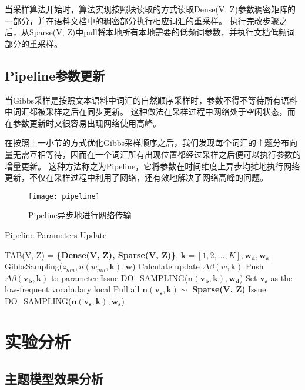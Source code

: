 当采样算法开始时，算法实现按照块读取的方式读取Dense(V, Z)参数稠密矩阵的一部分，并在语料文档中的稠密部分执行相应词汇的重采样。
执行完改步骤之后，从Sparse(V, Z)中pull将本地所有本地需要的低频词参数，并执行文档低频词部分的重采样。

\subsection{Pipeline参数更新}
当Gibbs采样是按照文本语料中词汇的自然顺序采样时，参数不得不等待所有语料中词汇都被采样之后在同步更新。
这种做法在采样过程中网络处于空闲状态，而在参数更新时又很容易出现网络使用高峰。

在按照上一小节的方式优化Gibbs采样顺序之后，我们发现每个词汇的主题分布向量无需互相等待，因而在一个词汇所有出现位置都经过采样之后便可以执行参数的增量更新。
这种方法称之为Pipeline，它将参数在时间维度上异步均摊地执行网络更新，不仅在采样过程中利用了网络，还有效地解决了网络高峰的问题。

\begin{figure}[htb]\centering
\texttt{[image: pipeline]}
\caption{Pipeline异步地进行网络传输}
\label{fig:pipeline}       %
\end{figure}


\begin{algorithm}[htb]
\caption{Pipeline Parameters Update} 
\label{alg:vocab-order}
\begin{algorithmic}[1]
\Require TAB(V, Z) = \textbf{\{Dense(V, Z), Sparse(V, Z)\}}, $\mathbf{k} = [1, 2, ..., K], \mathbf{w_d, w_s}$
\State GibbsSampling($z_{mn}, n(w_{mn}, \mathbf{k}), \mathbf{w}$)
\State Calculate update $\Delta \beta(w, \mathbf{k})$
\EndFor
\State Push $\Delta \beta(\mathbf{v_b}, \mathbf{k})$ to parameter
\EndFunction
{}
\State Issue DO\_SAMPLING($\mathbf{n(v_b, k), w_d}$)
\EndFor
\State Set $\mathbf{v_s}$ as the low-frequent vocabulary local
\State Pull all $\mathbf{n(v_s, k)} \sim $ \textbf{Sparse(V, Z)}
\State Issue DO\_SAMPLING($\mathbf{n(v_s, k), w_s}$)
\end{algorithmic}  
\end{algorithm}  

\section{实验分析}
\subsection{主题模型效果分析}

